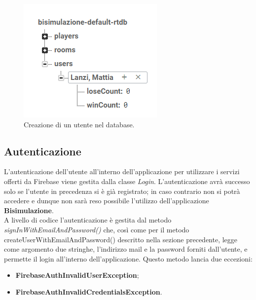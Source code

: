 \documentclass[a4paper,11pt,twoside,openright]{report}
\begin{document}
\begin{figure}[h]
\includegraphics{images/Users node.png}
\caption{Creazione di un utente nel database.}
\end{figure}

\subsection{Autenticazione}
L'autenticazione dell'utente all'interno dell'applicazione per utilizzare i servizi offerti da Firebase viene gestita dalla classe \textit{Login}. L'autenticazione avrà successo solo se l'utente in precedenza si è già registrato; in caso contrario non si potrà accedere e dunque non sarà reso possibile l'utilizzo dell'applicazione \textbf{Bisimulazione}.\\
A livello di codice l'autenticazione è gestita dal metodo \textit{signInWithEmailAndPassword()}\cite{5} che, così come per il metodo createUserWithEmailAndPassword() descritto nella sezione precedente, legge come argomento due stringhe, l'indirizzo mail e la password forniti dall'utente, e permette il login all'interno dell'applicazione. Questo metodo lancia due eccezioni:

\begin{itemize}
\item \textbf{FirebaseAuthInvalidUserException};

\item \textbf{FirebaseAuthInvalidCredentialsException}.
\end{itemize}
\end{document}
